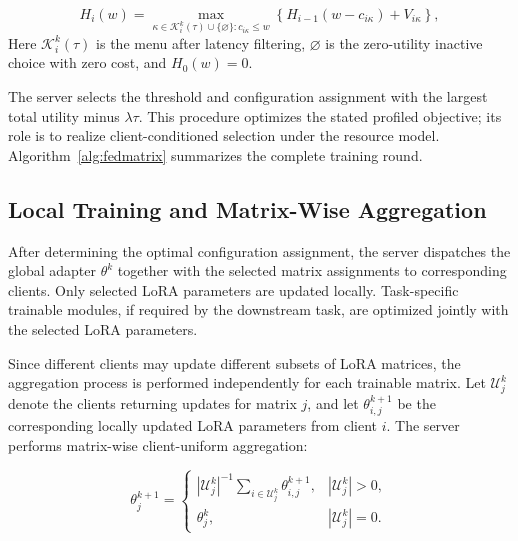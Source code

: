 \documentclass[10pt,conference,letterpaper]{IEEEtran}
\begin{document}
\begin{equation}
 H_i(w)=
 \max_{\kappa\in
 \mathcal K_i^k(\tau)\cup\{\varnothing\}:c_{i\kappa}\le w}
 \left\{
 H_{i-1}(w-c_{i\kappa})
 +
 V_{i\kappa}
 \right\},
 \label{eq:server-dp}
\end{equation}
Here $\mathcal K_i^k(\tau)$ is the menu after latency filtering, $\varnothing$ is the zero-utility inactive choice with zero cost, and $H_0(w)=0$.

The server selects the threshold and configuration assignment with the largest total utility minus $\lambda\tau$. This procedure optimizes the stated profiled objective; its role is to realize client-conditioned selection under the resource model. Algorithm~\ref{alg:fedmatrix} summarizes the complete training round.

\subsection{Local Training and Matrix-Wise Aggregation}

After determining the optimal configuration assignment, the server
dispatches the global adapter \(\theta^k\) together with the selected matrix
assignments to corresponding clients. Only selected LoRA parameters are updated locally. Task-specific trainable modules, if
required by the downstream task, are optimized jointly with the selected LoRA
parameters.

Since different clients may update different subsets of LoRA matrices, the
aggregation process is performed independently for each trainable matrix.
Let \(\mathcal U_j^k\) denote the clients returning updates for matrix \(j\), and let \(\theta_{i,j}^{k+1}\) be the corresponding locally updated LoRA parameters from client \(i\). The server performs matrix-wise client-uniform aggregation:

\begin{equation}
 \theta_j^{k+1}
 =
 \begin{cases}
 |\mathcal U_j^k|^{-1}
 \displaystyle\sum_{i\in \mathcal U_j^k}
 \theta_{i,j}^{k+1},
 &
 |\mathcal U_j^k|>0,
 \\[6pt]
 \theta_j^k,
 &
 |\mathcal U_j^k|=0 .
 \end{cases}
 \label{eq:aggregation}
\end{equation}
\end{document}
